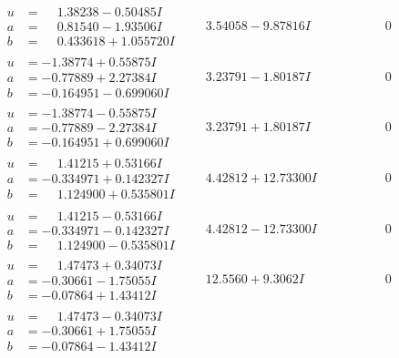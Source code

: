 \documentclass[1p]{elsarticle_modified}
\theoremstyle{definition}
\begin{document}
$$\begin{array}{c|c|c}
\begin{aligned}
u &= \phantom{-}1.38238 - 0.50485 I \\
a &= \phantom{-}0.81540 - 1.93506 I \\
b &= \phantom{-}0.433618 + 1.055720 I\end{aligned}
 & \phantom{-}3.54058 - 9.87816 I & \phantom{-0.000000 } 0 \\ \hline\begin{aligned}
u &= -1.38774 + 0.55875 I \\
a &= -0.77889 + 2.27384 I \\
b &= -0.164951 - 0.699060 I\end{aligned}
 & \phantom{-}3.23791 - 1.80187 I & \phantom{-0.000000 } 0 \\ \hline\begin{aligned}
u &= -1.38774 - 0.55875 I \\
a &= -0.77889 - 2.27384 I \\
b &= -0.164951 + 0.699060 I\end{aligned}
 & \phantom{-}3.23791 + 1.80187 I & \phantom{-0.000000 } 0 \\ \hline\begin{aligned}
u &= \phantom{-}1.41215 + 0.53166 I \\
a &= -0.334971 + 0.142327 I \\
b &= \phantom{-}1.124900 + 0.535801 I\end{aligned}
 & \phantom{-}4.42812 + 12.73300 I & \phantom{-0.000000 } 0 \\ \hline\begin{aligned}
u &= \phantom{-}1.41215 - 0.53166 I \\
a &= -0.334971 - 0.142327 I \\
b &= \phantom{-}1.124900 - 0.535801 I\end{aligned}
 & \phantom{-}4.42812 - 12.73300 I & \phantom{-0.000000 } 0 \\ \hline\begin{aligned}
u &= \phantom{-}1.47473 + 0.34073 I \\
a &= -0.30661 - 1.75055 I \\
b &= -0.07864 + 1.43412 I\end{aligned}
 & \phantom{-}12.5560 + 9.3062 I & \phantom{-0.000000 } 0 \\ \hline\begin{aligned}
u &= \phantom{-}1.47473 - 0.34073 I \\
a &= -0.30661 + 1.75055 I \\
b &= -0.07864 - 1.43412 I\end{aligned}

\end{array}$$
\end{document}
